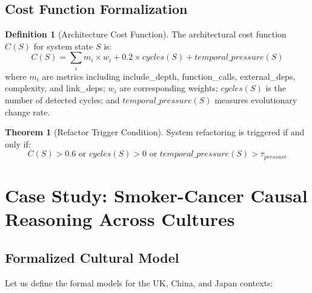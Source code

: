 \documentclass[11pt]{article}
\theoremstyle{definition}
\newtheorem{definition}{Definition}
\newtheorem{theorem}{Theorem}
\begin{document}
\subsection{Cost Function Formalization}

\begin{definition}[Architecture Cost Function]
The architectural cost function $C(S)$ for system state $S$ is:
\begin{equation}
C(S) = \sum_{i} m_i \times w_i + 0.2 \times cycles(S) + temporal\_pressure(S)
\end{equation}
where $m_i$ are metrics including include\_depth, function\_calls, external\_deps, complexity, and link\_deps; $w_i$ are corresponding weights; $cycles(S)$ is the number of detected cycles; and $temporal\_pressure(S)$ measures evolutionary change rate.
\end{definition}

\begin{theorem}[Refactor Trigger Condition]
System refactoring is triggered if and only if:
\begin{equation}
C(S) > 0.6 \text{ or } cycles(S) > 0 \text{ or } temporal\_pressure(S) > \tau_{pressure}
\end{equation}
\end{theorem}

\section{Case Study: Smoker-Cancer Causal Reasoning Across Cultures}

\subsection{Formalized Cultural Model}

Let us define the formal models for the UK, China, and Japan contexts:
\end{document}
